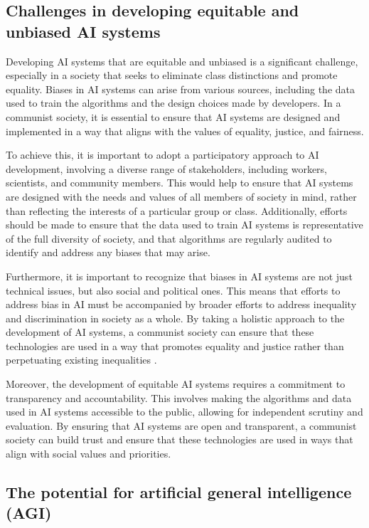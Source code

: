 \subsection{Challenges in developing equitable and unbiased AI systems}

Developing AI systems that are equitable and unbiased is a significant challenge, especially in a society that seeks to eliminate class distinctions and promote equality. Biases in AI systems can arise from various sources, including the data used to train the algorithms and the design choices made by developers. In a communist society, it is essential to ensure that AI systems are designed and implemented in a way that aligns with the values of equality, justice, and fairness.

To achieve this, it is important to adopt a participatory approach to AI development, involving a diverse range of stakeholders, including workers, scientists, and community members. This would help to ensure that AI systems are designed with the needs and values of all members of society in mind, rather than reflecting the interests of a particular group or class. Additionally, efforts should be made to ensure that the data used to train AI systems is representative of the full diversity of society, and that algorithms are regularly audited to identify and address any biases that may arise.

Furthermore, it is important to recognize that biases in AI systems are not just technical issues, but also social and political ones. This means that efforts to address bias in AI must be accompanied by broader efforts to address inequality and discrimination in society as a whole. By taking a holistic approach to the development of AI systems, a communist society can ensure that these technologies are used in a way that promotes equality and justice rather than perpetuating existing inequalities \cite[pp.~53-57]{Eubanks2018AutomatingInequality}.

Moreover, the development of equitable AI systems requires a commitment to transparency and accountability. This involves making the algorithms and data used in AI systems accessible to the public, allowing for independent scrutiny and evaluation. By ensuring that AI systems are open and transparent, a communist society can build trust and ensure that these technologies are used in ways that align with social values and priorities.

\subsection{The potential for artificial general intelligence (AGI)}

